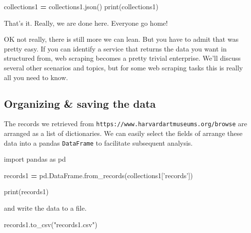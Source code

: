 \documentclass[]{book}
\newenvironment{Shaded}{\begin{snugshade}}{\end{snugshade}}
\newcommand{\StringTok}[1]{\textcolor[rgb]{0.31,0.60,0.02}{#1}}
\newcommand{\ImportTok}[1]{#1}
\newcommand{\OperatorTok}[1]{\textcolor[rgb]{0.81,0.36,0.00}{\textbf{#1}}}
\newcommand{\BuiltInTok}[1]{#1}
\newcommand{\NormalTok}[1]{#1}
\begin{document}
\begin{Shaded}
\begin{Highlighting}[]
\NormalTok{collections1 }\OperatorTok{=}\NormalTok{ collections1.json()}
\BuiltInTok{print}\NormalTok{(collections1)}
\end{Highlighting}
\end{Shaded}

That's it. Really, we are done here. Everyone go home!

OK not really, there is still more we can lean. But you have to admit
that was pretty easy. If you can identify a service that returns the
data you want in structured from, web scraping becomes a pretty trivial
enterprise. We'll discuss several other scenarios and topics, but for
some web scraping tasks this is really all you need to know.

\subsection{Organizing \& saving the
data}\label{organizing-saving-the-data}

The records we retrieved from
\texttt{https://www.harvardartmuseums.org/browse} are arranged as a list
of dictionaries. We can easily select the fields of arrange these data
into a pandas \texttt{DataFrame} to facilitate subsequent analysis.

\begin{Shaded}
\begin{Highlighting}[]
\ImportTok{import}\NormalTok{ pandas }\ImportTok{as}\NormalTok{ pd}
\end{Highlighting}
\end{Shaded}

\begin{Shaded}
\begin{Highlighting}[]
\NormalTok{records1 }\OperatorTok{=}\NormalTok{ pd.DataFrame.from_records(collections1[}\StringTok{'records'}\NormalTok{])}
\end{Highlighting}
\end{Shaded}

\begin{Shaded}
\begin{Highlighting}[]
\BuiltInTok{print}\NormalTok{(records1)}
\end{Highlighting}
\end{Shaded}

and write the data to a file.

\begin{Shaded}
\begin{Highlighting}[]
\NormalTok{records1.to_csv(}\StringTok{"records1.csv"}\NormalTok{)}
\end{Highlighting}
\end{Shaded}
\end{document}
